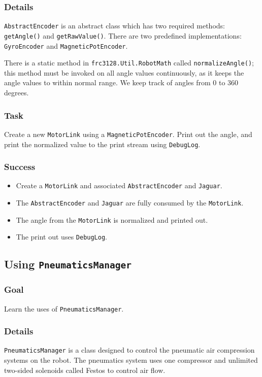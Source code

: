 \documentclass[a4paper]{article}
\begin{document}
\subsubsection{Details} \lstinline{AbstractEncoder} is an abstract class which has two required methods: \lstinline{getAngle()} and \lstinline{getRawValue()}. There are two predefined implementations: \lstinline{GyroEncoder} and \lstinline{MagneticPotEncoder}. 

There is a static method in \lstinline{frc3128.Util.RobotMath} called \lstinline{normalizeAngle()}; this method must be invoked on all angle values continuously, as it keeps the angle values to within normal range. We keep track of angles from 0 to 360 degrees. 
\subsubsection{Task} Create a new \lstinline{MotorLink} using a \lstinline{MagneticPotEncoder}. Print out the angle, and print the normalized value to the print stream using \lstinline{DebugLog}.
\subsubsection{Success}\begin{itemize}\item{Create a \lstinline{MotorLink} and associated \lstinline{AbstractEncoder} and \lstinline{Jaguar}.}\item{The \lstinline{AbstractEncoder} and \lstinline{Jaguar} are fully consumed by the \lstinline{MotorLink}.}\item{The angle from the \lstinline{MotorLink} is normalized and printed out.}\item{The print out uses \lstinline{DebugLog}.}\end{itemize}

\pagebreak\subsection{Using \lstinline{PneumaticsManager}}
\subsubsection{Goal} Learn the uses of \lstinline{PneumaticsManager}.
\subsubsection{Details} \lstinline{PneumaticsManager} is a class designed to control the pneumatic air compression systems on the robot. The pneumatics system uses one compressor and unlimited two-sided solenoids called Festos to control air flow. 
\end{document}
